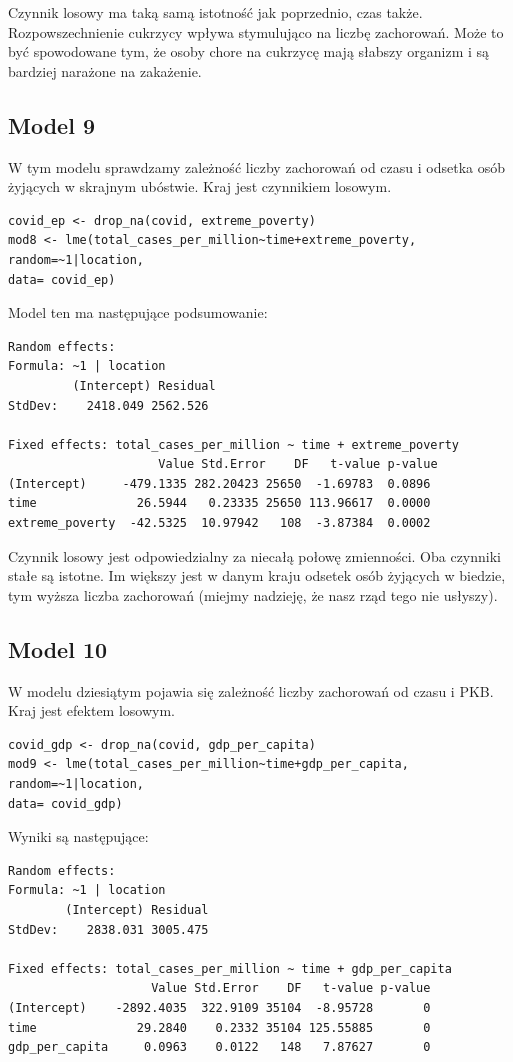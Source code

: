 \documentclass[12pt]{mwbk}
\theoremstyle{plain}
\theoremstyle{definition}
\theoremstyle{remark}
\begin{document}
Czynnik losowy ma taką samą istotność jak poprzednio, czas także. Rozpowszechnienie cukrzycy wpływa stymulująco na liczbę zachorowań. Może to być spowodowane tym, że osoby chore na cukrzycę mają słabszy organizm i są bardziej narażone na zakażenie.
\subsection{Model 9}

W tym modelu sprawdzamy zależność liczby zachorowań od czasu i odsetka osób żyjących w skrajnym ubóstwie. Kraj jest czynnikiem losowym.

\begin{verbatim}
covid_ep <- drop_na(covid, extreme_poverty)
mod8 <- lme(total_cases_per_million~time+extreme_poverty,
random=~1|location,
data= covid_ep)
\end{verbatim}

Model ten ma następujące podsumowanie:
\begin{verbatim}
Random effects:
Formula: ~1 | location
         (Intercept) Residual
StdDev:    2418.049 2562.526

Fixed effects: total_cases_per_million ~ time + extreme_poverty 
                     Value Std.Error    DF   t-value p-value
(Intercept)     -479.1335 282.20423 25650  -1.69783  0.0896
time              26.5944   0.23335 25650 113.96617  0.0000
extreme_poverty  -42.5325  10.97942   108  -3.87384  0.0002
\end{verbatim}

Czynnik losowy jest odpowiedzialny za niecałą połowę zmienności. Oba czynniki stałe są istotne. Im większy jest w danym kraju odsetek osób żyjących w biedzie, tym wyższa liczba zachorowań (miejmy nadzieję, że nasz rząd tego nie usłyszy).

\subsection{Model 10}
W modelu dziesiątym pojawia się zależność liczby zachorowań od czasu i PKB. Kraj jest efektem losowym.

\begin{verbatim}
covid_gdp <- drop_na(covid, gdp_per_capita)
mod9 <- lme(total_cases_per_million~time+gdp_per_capita,
random=~1|location,
data= covid_gdp)
\end{verbatim}

Wyniki są następujące:
\begin{verbatim}
Random effects:
Formula: ~1 | location
        (Intercept) Residual
StdDev:    2838.031 3005.475

Fixed effects: total_cases_per_million ~ time + gdp_per_capita 
                    Value Std.Error    DF   t-value p-value
(Intercept)    -2892.4035  322.9109 35104  -8.95728       0
time              29.2840    0.2332 35104 125.55885       0
gdp_per_capita     0.0963    0.0122   148   7.87627       0
\end{verbatim}
\end{document}
